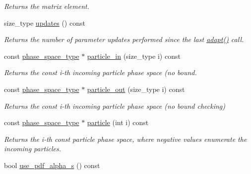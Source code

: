 \begin{DoxyCompactItemize}
\begin{DoxyCompactList}\small\item\em Returns the matrix element. \end{DoxyCompactList}\item 
size\-\_\-type \hyperlink{a00430_ae23a9709f1f19e1bb8f7109769296b83}{updates} () const 
\begin{DoxyCompactList}\small\item\em Returns the number of parameter updates performed since the last \hyperlink{a00430_a7f97f414b5f3d689efb551aa4f6b1d1c}{adapt()} call. \end{DoxyCompactList}\item 
\hypertarget{a00430_a3203c3acdc1ff32dd2e524e9fa536cf6}{const \hyperlink{a00400}{phase\-\_\-space\-\_\-type} $\ast$ \hyperlink{a00430_a3203c3acdc1ff32dd2e524e9fa536cf6}{particle\-\_\-in} (size\-\_\-type i) const }\label{a00430_a3203c3acdc1ff32dd2e524e9fa536cf6}

\begin{DoxyCompactList}\small\item\em Returns the const i-\/th incoming particle phase space (no bound. \end{DoxyCompactList}\item 
\hypertarget{a00430_a20c6bf03b10a4ea91a9283041168753e}{const \hyperlink{a00400}{phase\-\_\-space\-\_\-type} $\ast$ \hyperlink{a00430_a20c6bf03b10a4ea91a9283041168753e}{particle\-\_\-out} (size\-\_\-type i) const }\label{a00430_a20c6bf03b10a4ea91a9283041168753e}

\begin{DoxyCompactList}\small\item\em Returns the const i-\/th incoming particle phase space (no bound checking) \end{DoxyCompactList}\item 
const \hyperlink{a00400}{phase\-\_\-space\-\_\-type} $\ast$ \hyperlink{a00430_a505447e7e96d765e69d9e622439bbc52}{particle} (int i) const 
\begin{DoxyCompactList}\small\item\em Returns the i-\/th const particle phase space, where negative values enumerate the incoming particles. \end{DoxyCompactList}\item 
\hypertarget{a00430_a91b7ae85d57c380f1508a16a5cde31b6}{bool \hyperlink{a00430_a91b7ae85d57c380f1508a16a5cde31b6}{use\-\_\-pdf\-\_\-alpha\-\_\-s} () const }\label{a00430_a91b7ae85d57c380f1508a16a5cde31b6}


\end{DoxyCompactItemize}
